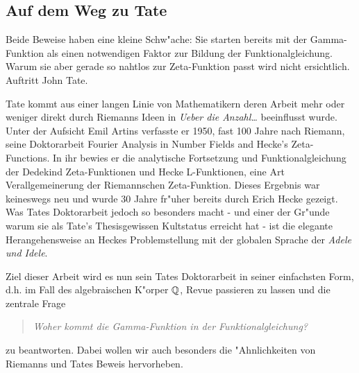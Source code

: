 \subsection{Auf dem Weg zu Tate}
	Beide Beweise haben eine kleine Schw"ache: Sie starten bereits mit der Gamma-Funktion als einen notwendigen Faktor zur Bildung der Funktionalgleichung.
	Warum sie aber gerade so nahtlos zur Zeta-Funktion passt wird nicht ersichtlich. 
	Auftritt John Tate.
	
	Tate kommt aus einer langen Linie von Mathematikern deren Arbeit mehr oder weniger direkt durch Riemanns Ideen in  \emph{Ueber die Anzahl\dots} beeinflusst wurde.
	Unter der Aufsicht Emil Artins verfasste er 1950, fast 100 Jahre nach Riemann, seine Doktorarbeit \glqq Fourier Analysis in Number Fields and Hecke's Zeta-Functions\grqq{}\cite{tate}.
	In ihr bewies er die analytische Fortsetzung und Funktionalgleichung der Dedekind Zeta-Funktionen und Hecke L-Funktionen, eine Art Verallgemeinerung der Riemannschen Zeta-Funktion.
	Dieses Ergebnis war keineswegs neu und wurde 30 Jahre fr"uher bereits durch Erich Hecke gezeigt.
	Was Tates Doktorarbeit jedoch so besonders macht - und einer der Gr"unde warum sie als  \glqq Tate's Thesis\grqq{}gewissen Kultstatus erreicht hat - ist die elegante Herangehensweise an Heckes Problemstellung mit der globalen Sprache der \emph{Adele und Idele}.
	
	Ziel dieser Arbeit wird es nun sein Tates Doktorarbeit in seiner einfachsten Form, d.h. im Fall des algebraischen K"orper $\mathbb{Q}$, Revue passieren zu lassen und die zentrale Frage
	\begin{quote}
		\centering
		\textit{Woher kommt die Gamma-Funktion in der Funktionalgleichung?}
	\end{quote}
	zu beantworten. Dabei wollen wir auch besonders die "Ahnlichkeiten von Riemanns und Tates Beweis hervorheben.
	
